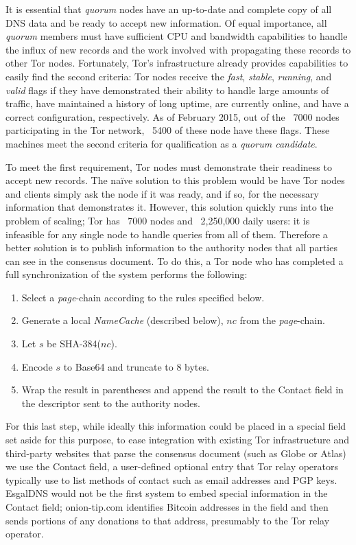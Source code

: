 It is essential that \textit{quorum} nodes have an up-to-date and complete copy of all DNS data and be ready to accept new information. Of equal importance, all \textit{quorum} members must have sufficient CPU and bandwidth capabilities to handle the influx of new records and the work involved with propagating these records to other Tor nodes. Fortunately, Tor's infrastructure already provides capabilities to easily find the second criteria: Tor nodes receive the \textit{fast}, \textit{stable}, \textit{running},  and \textit{valid} flags if they have demonstrated their ability to handle large amounts of traffic, have maintained a history of long uptime, are currently online, and have a correct configuration, respectively. As of February 2015, out of the ~7000 nodes participating in the Tor network, ~5400 of these node have these flags. These machines meet the second criteria for qualification as a \textit{quorum candidate}.

To meet the first requirement, Tor nodes must demonstrate their readiness to accept new records. The na\"{i}ve solution to this problem would be have Tor nodes and clients simply ask the node if it was ready, and if so, for the necessary information that demonstrates it. However, this solution quickly runs into the problem of scaling; Tor has ~7000 nodes and ~2,250,000 daily users\cite{TorMetrics}: it is infeasible for any single node to handle queries from all of them. Therefore a better solution is to publish information to the authority nodes that all parties can see in the consensus document. To do this, a Tor node who has completed a full synchronization of the system performs the following:

\begin{enumerate}
	\item Select a \textit{page}-chain according to the rules specified below.
	\item Generate a local \textit{NameCache} (described below), $ nc $ from the \textit{page}-chain.
	\item Let $ s $ be SHA-384($ nc $).
	\item Encode $ s $ to Base64 and truncate to 8 bytes.
	\item Wrap the result in parentheses and append the result to the Contact field in the descriptor sent to the authority nodes.
\end{enumerate}

For this last step, while ideally this information could be placed in a special field set aside for this purpose, to ease integration with existing Tor infrastructure and third-party websites that parse the consensus document (such as Globe or Atlas) we use the Contact field, a user-defined optional entry that Tor relay operators typically use to list methods of contact such as email addresses and PGP keys. EsgalDNS would not be the first system to embed special information in the Contact field; onion-tip.com identifies Bitcoin addresses in the field and then sends portions of any donations to that address, presumably to the Tor relay operator.

